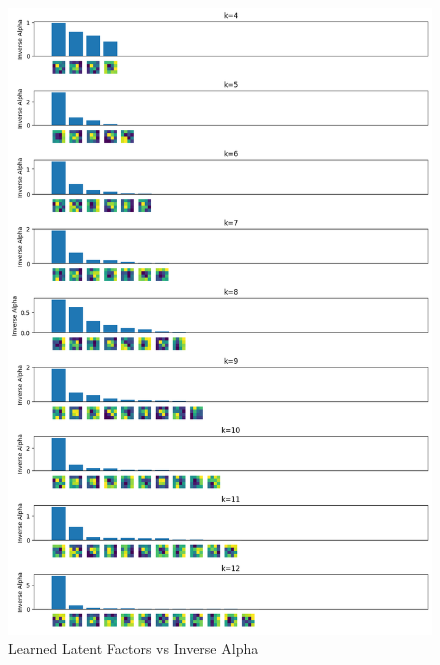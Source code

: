 \documentclass[12pt]{article}
\begin{document}
\begin{figure}[h]
\centering
\includegraphics[scale=0.47]{outputs/q5/d-1-latent-factors-comparison}
\caption{Learned Latent Factors vs Inverse Alpha}
\label{fig:}
\end{figure}
\end{document}
